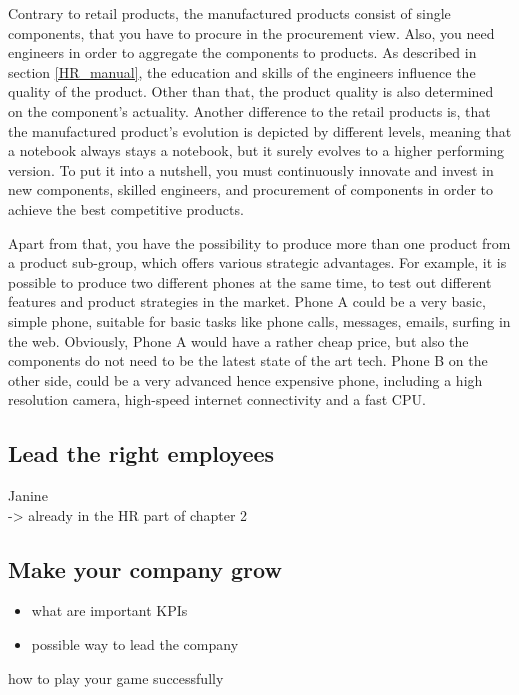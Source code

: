 \documentclass[11pt,titlepage,oneside,openany]{book}
\begin{document}
Contrary to retail products, the manufactured products consist of single components, that you have to procure in the procurement view. Also, you need engineers in order to aggregate the components to products. As described in section \ref{HR_manual}, the education and skills of the engineers influence the quality of the product. Other than that, the product quality is also determined on the component's actuality. Another difference to the retail products is, that the manufactured product's evolution is depicted by different levels, meaning that a notebook always stays a notebook, but it surely evolves to a higher performing version. To put it into a nutshell, you must continuously innovate and invest in new components, skilled engineers, and procurement of components in order to achieve the best competitive products. 

Apart from that, you have the possibility to produce more than one product from a product sub-group, which offers various strategic advantages. For example, it is possible to produce two different phones at the same time, to test out different features and product strategies in the market. Phone A could be a very basic, simple phone, suitable for basic tasks like phone calls, messages, emails, surfing in the web. Obviously, Phone A would have a rather cheap price, but also the components do not need to be the latest state of the art tech. Phone B on the other side, could be a very advanced hence expensive phone, including a high resolution camera, high-speed internet connectivity and a fast CPU.

\subsection{Lead the right employees}
Janine \\
-> already in the HR part of chapter 2

\subsection{Make your company grow}
\begin{itemize}
    \item what are important KPIs
    \item possible way to lead the company
\end{itemize}
how to play your game successfully
\end{document}
